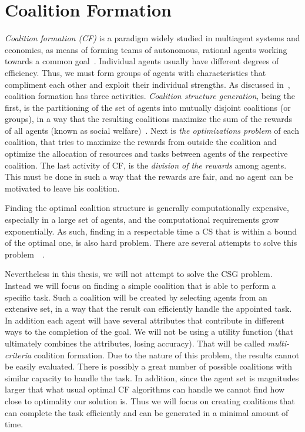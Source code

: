 \section{Coalition Formation}
{\em Coalition formation (CF)} is a paradigm widely studied in multiagent systems and economics, as means of forming teams of autonomous, rational agents working towards a common goal~\cite{chalkiadakis2011computational}. Individual agents usually have different degrees of efficiency. Thus, we must form groups of agents with characteristics that compliment each other and exploit their individual strengths\cite{shehory1998methods}.
As discussed in~\cite{sandholm1999coalition}, coalition formation has three activities. {\em Coalition structure generation}, being the first, is the partitioning of the set of agents into mutually disjoint coalitions (or groups), in a way that the resulting coalitions maximize the sum of the rewards of all agents (known as social welfare)~\cite{rahwan2009anytime}. Next is {\em the optimizations problem} of each coalition, that tries to maximize the rewards from outside the coalition and optimize the allocation of resources and tasks between agents of the respective coalition. The last activity of CF, is the {\em division of the rewards} among agents. This must be done in such a way that the rewards are fair, and no agent can be motivated to leave his coalition.

Finding the optimal coalition structure is generally computationally expensive, especially in a large set of agents, and the computational requirements grow exponentially. As such, finding in a respectable time a CS that is within a bound of the optimal one, is also hard problem. There are several attempts to solve this problem~\cite{sandholm1999coalition}~\cite{rahwan2009anytime}.

Nevertheless in this thesis, we will not attempt to solve the CSG problem. Instead we will focus on finding a simple coalition that is able to perform a specific task. Such a coalition will be created by selecting agents from an extensive set, in a way that the result can efficiently handle the appointed task. In addition each agent will have several attributes that contribute in different ways to the completion of the goal. We will not be using a utility function (that ultimately combines the attributes, losing accuracy). That will be called {\em multi-criteria} coalition formation. Due to the nature of this problem, the results cannot be easily evaluated. There is possibly a great number of possible coalitions with similar capacity to handle the task. In addition, since the agent set is magnitudes larger that what usual optimal CF algorithms can handle we cannot find how close to optimality our solution is. Thus we will focus on creating coalitions that can complete the task efficiently and can be generated in a minimal amount of time.

